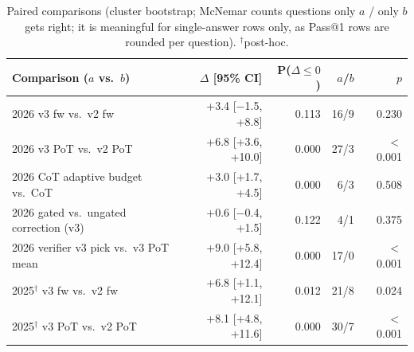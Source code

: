 \begin{table}[!t]
\centering
\scriptsize
\caption{Paired comparisons (cluster bootstrap; McNemar counts questions only $a$ / only $b$ gets right; it is meaningful for single-answer rows only, as Pass@1 rows are rounded per question). $^\dagger$post-hoc.}
\label{tab:cmp}
\setlength{\tabcolsep}{2.5pt}
\begin{tabular}{lrrrr}
\toprule
Comparison ($a$ vs.\ $b$) & $\Delta$ [95\% CI] & P($\Delta{\le}0$) & $a$/$b$ & $p$ \\
\midrule
2026 v3 fw vs.\ v2 fw & +3.4 [$-$1.5, +8.8] & 0.113 & 16/9 & 0.230 \\
2026 v3 PoT vs.\ v2 PoT & +6.8 [+3.6, +10.0] & 0.000 & 27/3 & $<$0.001 \\
2026 CoT adaptive budget vs.\ CoT & +3.0 [+1.7, +4.5] & 0.000 & 6/3 & 0.508 \\
2026 gated vs.\ ungated correction (v3) & +0.6 [$-$0.4, +1.5] & 0.122 & 4/1 & 0.375 \\
2026 verifier v3 pick vs.\ v3 PoT mean & +9.0 [+5.8, +12.4] & 0.000 & 17/0 & $<$0.001 \\
2025$^\dagger$ v3 fw vs.\ v2 fw & +6.8 [+1.1, +12.1] & 0.012 & 21/8 & 0.024 \\
2025$^\dagger$ v3 PoT vs.\ v2 PoT & +8.1 [+4.8, +11.6] & 0.000 & 30/7 & $<$0.001 \\
\bottomrule
\end{tabular}
\end{table}
